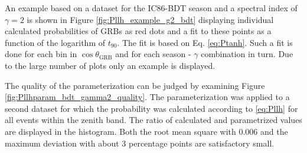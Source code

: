 An example based on a dataset for the IC86-BDT season and a spectral index of 
$\gamma=2$ is shown in Figure
\ref{fig:Pllh_example_g2_bdt} displaying individual calculated probabilities of 
GRBs as red dots and a fit to these points as a function of the logarithm of 
$t_{90}$. The fit is based on Eq. \ref{eq:Ptanh}. Such a fit is done for each 
bin in $\cos \theta_\text{GRB}$ and for each season - $\gamma$ combination in 
turn. Due to the large number of plots only an example is displayed.

The quality of the parameterization can be judged by examining Figure 
\ref{fig:Pllhparam_bdt_gamma2_quality}. The parameterization was applied to a 
second dataset for which the probability was calculated according to 
\ref{eq:Pllh} for all events within the zenith band. The ratio of calculated 
and parametrized values are displayed in the histogram. Both the root mean 
square with $0.006$ and the maximum deviation with about 3 
percentage points are satisfactory small. 

\begin{figure}[h]
\centering
 \captionsetup{width=.4\textwidth}
\end{figure}


